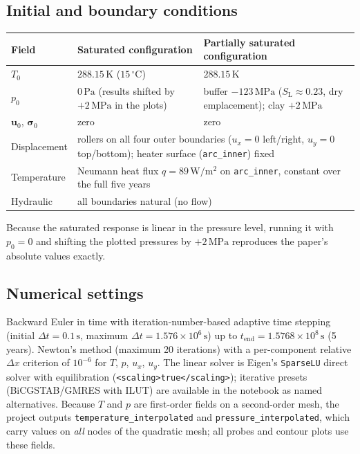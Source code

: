 \documentclass[11pt,a4paper]{tubaf-report}
\newcommand{\vect}[1]{\bm{#1}}
\newcommand{\ten}[1]{\bm{#1}}
\newcommand{\MPa}{\,\mathrm{MPa}}
\newcommand{\degC}{\,^\circ\mathrm{C}}
\begin{document}
\subsection{Initial and boundary conditions}

\begin{center}
\begin{tabularx}{\textwidth}{@{}lXX@{}}
\toprule
Field & Saturated configuration & Partially saturated configuration \\
\midrule
$T_0$ & $288.15\,\mathrm K$ ($15\degC$) & $288.15\,\mathrm K$ \\
$p_0$ & $0\,\mathrm{Pa}$ (results shifted by $+2\MPa$ in the plots) &
  buffer $-123\MPa$ ($S_{\mathrm L}\approx0.23$, dry emplacement);
  clay $+2\MPa$ \\
$\vect u_0$, $\ten\sigma_0$ & zero & zero \\
\midrule
Displacement & \multicolumn{2}{p{0.72\textwidth}}{rollers on all four outer
  boundaries ($u_x=0$ left/right, $u_y=0$ top/bottom); heater surface
  (\texttt{arc\_inner}) fixed} \\
Temperature & \multicolumn{2}{p{0.72\textwidth}}{Neumann heat flux
  $q=89\,\mathrm{W/m^2}$ on \texttt{arc\_inner}, constant over the full five
  years} \\
Hydraulic & \multicolumn{2}{p{0.72\textwidth}}{all boundaries natural (no
  flow)} \\
\bottomrule
\end{tabularx}
\end{center}

Because the saturated response is linear in the pressure level, running it
with $p_0=0$ and shifting the plotted pressures by $+2\MPa$ reproduces the
paper's absolute values exactly.

\subsection{Numerical settings}

Backward Euler in time with iteration-number-based adaptive time stepping
(initial $\Delta t=0.1\,\mathrm s$, maximum
$\Delta t=1.576\times10^6\,\mathrm s$) up to
$t_{\mathrm{end}}=1.5768\times10^8\,\mathrm s$ (5 years). Newton's method
(maximum 20 iterations) with a per-component relative $\Delta x$ criterion of
$10^{-6}$ for $T$, $p$, $u_x$, $u_y$. The linear solver is Eigen's
\texttt{SparseLU} direct solver with equilibration
(\texttt{<scaling>true</scaling>}); iterative presets
(BiCGSTAB/GMRES with ILUT) are available in the notebook as named
alternatives. Because $T$ and $p$ are first-order fields on a second-order
mesh, the project outputs \texttt{temperature\_interpolated} and
\texttt{pressure\_interpolated}, which carry values on \emph{all} nodes of
the quadratic mesh; all probes and contour plots use these fields.
\end{document}
